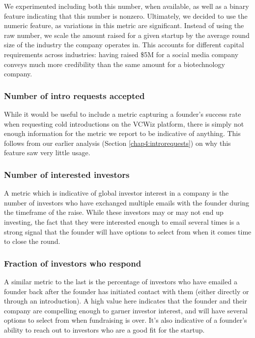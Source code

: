 We experimented including both this number, when available, as well as a binary feature indicating that this number is nonzero. Ultimately, we decided to use the numeric feature, as variations in this metric are significant. Instead of using the raw number, we scale the amount raised for a given startup by the average round size of the industry the company operates in. This accounts for different capital requirements across industries: having raised \$5M for a social media company conveys much more credibility than the same amount for a biotechnology company.

\subsubsection{Number of intro requests accepted}

While it would be useful to include a metric capturing a founder's success rate when requesting cold introductions on the VCWiz platform, there is simply not enough information for the metric we report to be indicative of anything. This follows from our earlier analysis (Section \ref{chap4:introrequests}) on why this feature saw very little usage.

\subsubsection{Number of interested investors}

A metric which is indicative of global investor interest in a company is the number of investors who have exchanged multiple emails with the founder during the timeframe of the raise. While these investors may or may not end up investing, the fact that they were interested enough to email several times is a strong signal that the founder will have options to select from when it comes time to close the round.

\subsubsection{Fraction of investors who respond}

A similar metric to the last is the percentage of investors who have emailed a founder back after the founder has initiated contact with them (either directly or through an introduction). A high value here indicates that the founder and their company are compelling enough to garner investor interest, and will have several options to select from when fundraising is over. It's also indicative of a founder's ability to reach out to investors who are a good fit for the startup.

